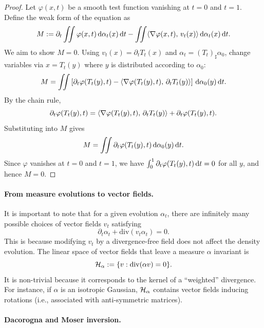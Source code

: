 \begin{proof}
Let $\varphi(x,t)$ be a smooth test function vanishing at $t=0$ and $t=1$. Define the weak form of the equation as 
$$
M := \partial_t \iint \varphi(x,t) \, \mathrm{d} \alpha_t(x) \, \mathrm{d} t - \iint \langle \nabla \varphi(x,t),\,v_t(x)\rangle \, \mathrm{d} \alpha_t(x) \, \mathrm{d} t.
$$
We aim to show $M = 0$. Using $v_t(x) = \partial_t T_t(x)$ and $\alpha_t = (T_t)_\sharp \alpha_0$, change variables via $x = T_t(y)$ where $y$ is distributed according to $\alpha_0$:
$$
M = \iint \left[ \partial_t \varphi(T_t(y),t) - \langle \nabla \varphi(T_t(y),t),\,\partial_t T_t(y)\rangle \right] \, \mathrm{d} \alpha_0(y) \, \mathrm{d} t.
$$
By the chain rule,
$$
\partial_t \varphi(T_t(y),t) = \langle \nabla \varphi(T_t(y),t),\,\partial_t T_t(y)\rangle + \partial_t \varphi(T_t(y),t).
$$
Substituting into $M$ gives
$$
M = \iint \partial_t \varphi(T_t(y),t) \, \mathrm{d} \alpha_0(y) \, \mathrm{d} t.
$$
Since $\varphi$ vanishes at $t=0$ and $t=1$, we have
$
\int_0^1 \partial_t \varphi(T_t(y),t) \, \mathrm{d} t = 0
$
for all $y$, and hence $M = 0$.
\end{proof}



\paragraph{From measure evolutions to vector fields.}

It is important to note that for a given evolution $\alpha_t$, there are infinitely many possible choices of vector fields $v_t$ satisfying
\begin{equation}
    \partial_t \alpha_t + \mathrm{div}(v_t \alpha_t) = 0. \label{eq:inverse-flow}
\end{equation}
This is because modifying $v_t$ by a divergence-free field does not affect the density evolution. The linear space of vector fields that leave a measure $\alpha$ invariant is 
$$
	\mathcal{H}_\alpha := \{ v : \mathrm{div}( \alpha v ) = 0 \}. 
$$
It is non-trivial because it corresponds to the kernel of a ``weighted'' divergence. For instance, if $\alpha$ is an isotropic Gaussian, $\mathcal{H}_\alpha$ contains vector fields inducing rotations (i.e., associated with anti-symmetric matrices).

\paragraph{Dacorogna and Moser inversion.}

